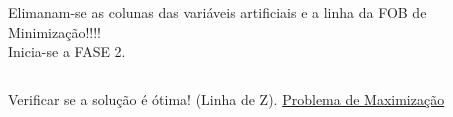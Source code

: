 \documentclass{beamer}
\begin{document}
\begin{frame}
{\begin{columns}
\begin{column}{5cm}
			\end{column}
		\end{columns}
	}	
	{
		\begin{columns}
			\begin{column}{5cm}
				\begin{mdframed}[backgroundcolor=red!80]
					\centering
					Elimanam-se as colunas das variáveis artificiais e a linha da FOB de Minimização!!!! \\
					Inicia-se a FASE 2.
				\end{mdframed}
			\end{column}
			\begin{column}{5cm}

			\end{column}
		\end{columns}
	}	
	\only<15>
	{
		\begin{columns}
			\begin{column}{5cm}
				\begin{mdframed}[backgroundcolor=olive!80]
					Verificar se a solução é ótima! (Linha de Z). \underline{Problema de Maximização}
				\end{mdframed}
			\end{column}
			\begin{column}{5cm}


\end{column}
\end{columns}}
\end{frame}
\end{document}
